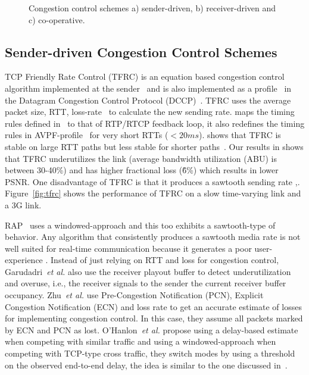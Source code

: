 \begin{figure}
  \centerline{
  }
  \centerline{
  }
  \centerline{
  }
  \caption{Congestion control schemes a) sender-driven, b) receiver-driven
and c) co-operative.}
  \label{fig:cc:scheme}
\end{figure}


\subsection{Sender-driven Congestion Control Schemes}

TCP Friendly Rate Control (TFRC) is an equation based congestion control
algorithm implemented at the sender~\cite{tfrc_347397} and is also implemented
as a profile~\cite{rfc4342} in the Datagram Congestion Control Protocol
(DCCP)~\cite{rfc4340}. TFRC uses the average packet size, RTT,
loss-rate~\cite{rfc3448} to calculate the new sending rate.
\cite{draft.rtp.tfrc} maps the timing rules defined in~\cite{rfc4828, rfc5348}
to that of RTP/RTCP feedback loop, it also redefines the timing rules in
AVPF-profile~\cite{rfc4585} for very short RTTs ($<20ms$).
\cite{Gharai06:ICME} shows that TFRC is stable on large RTT paths but less
stable for shorter paths~\cite{saurin:2006:thesis}. Our results in
 shows that TFRC underutilizes the link (average bandwidth
utilization (ABU) is between 30-40\%) and has higher fractional loss (\~6\%)
which results in lower PSNR. One disadvantage of TFRC is that it produces a
sawtooth sending rate \cite{saurin:2006:thesis},.
Figure~\ref{fig:tfrc} shows the performance of TFRC on a slow time-varying
link and a 3G link.

RAP~\cite{rap:752152} uses a windowed-approach and this too exhibits a
sawtooth-type of behavior. Any algorithm that consistently produces a sawtooth
media rate is not well suited for real-time communication because it generates
a poor user-experience \cite{Gharai:2002wt,VladBalan:2007dq,
Zink03subjectiveimpression}. Instead of just relying on RTT and loss for
congestion control, Garudadri~\textit{et al.}\cite{4397059} also use the
receiver playout buffer to detect underutilization and overuse, i.e., the
receiver signals to the sender the current receiver buffer occupancy.
Zhu~\textit{et al.}\cite{rmcat-nada} use Pre-Congestion Notification (PCN),
Explicit Congestion Notification (ECN) and loss rate to get an accurate
estimate of losses for implementing congestion control. In this case, they
assume all packets marked by ECN and PCN as lost. O'Hanlon~\textit{et
al.}\cite{rmcat-dflow} propose using a delay-based estimate when competing
with similar traffic and using a windowed-approach when competing with
TCP-type cross traffic, they switch modes by using a threshold on the observed
end-to-end delay, the idea is similar to the one discussed
in~\cite{budzisz2011fair}.

